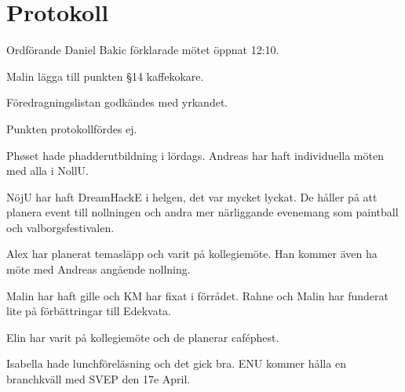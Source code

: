 \documentclass[10pt]{article}
\def\mo{Daniel Bakic}
\begin{document}
\section*{Protokoll}
\begin{paragrafer}
	Ordförande {\mo} förklarade mötet öppnat 12:10.

	{\valavmo}

	{\valavms}

	{\valavj}

	{\tosg}

	{\ingaadj}


	Malin \ypa lägga till punkten \S14 kaffekokare.

	Föredragningslistan godkändes med yrkandet.

	\ingaprot

	\begin{fyllnadsval} %
	\end{fyllnadsval}

	\begin{paragrafer}
		Punkten protokollfördes ej.


		Phøset hade phadderutbildning i lördags. Andreas har haft individuella möten med alla i NollU.

		NöjU har haft DreamHackE i helgen, det var mycket lyckat. De håller på att planera event till nollningen och andra mer närliggande evenemang som paintball och valborgsfestivalen.

		Alex har planerat temasläpp och varit på kollegiemöte. Han kommer även ha möte med Andreas angående nollning.

		Malin har haft gille och KM har fixat i förrådet. Rahne och Malin har funderat lite på förbättringar till Edekvata.

		Elin har varit på kollegiemöte och de planerar caféphest.

		Isabella hade lunchföreläsning och det gick bra. ENU kommer hålla en branchkväll med SVEP den 17e April.


\end{paragrafer}
\end{paragrafer}
\end{document}
